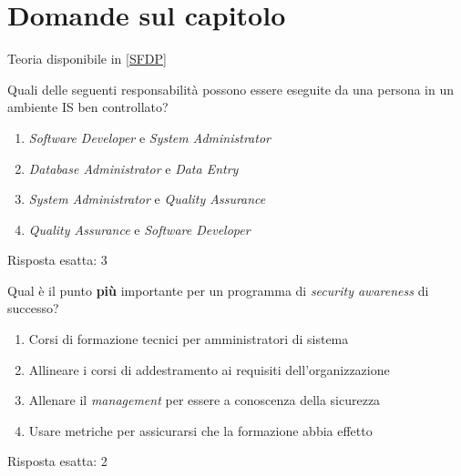 \section{Domande sul capitolo}
\label{esSFDP:generali}

Teoria disponibile in \ref{SFDP}


\begin{Exercise} [
  title={Quiz},
  label={esSFDP5}
  ]

  \Question Quali delle seguenti responsabilità possono essere eseguite da una 
persona in un ambiente IS ben controllato?
\begin{enumerate}
 \item \textit{Software Developer} e \textit{System Administrator}
 \item \textit{Database Administrator} e \textit{Data Entry}
 \item \textit{System Administrator} e \textit{Quality Assurance}
 \item \textit{Quality Assurance} e \textit{Software Developer}
\end{enumerate}
  
\end{Exercise}


\begin{Answer} [
  ref={esSFDP5},
  number={5}
  ]

  \Question Risposta esatta: 3
\end{Answer}


\begin{Exercise} [
  title={Quiz},
  label={esSFDP6}
  ]

  \Question Qual è il punto \textbf{più} importante per un programma di 
\textit{security awareness} di successo?
\begin{enumerate}
 \item Corsi di formazione tecnici per amministratori di sistema
 \item Allineare i corsi di addestramento ai requisiti dell'organizzazione
 \item Allenare il \textit{management} per essere a conoscenza della sicurezza
 \item Usare metriche per assicurarsi che la formazione abbia effetto
\end{enumerate}
  
\end{Exercise}


\begin{Answer} [
  ref={esSFDP6},
  number={6}
  ]

  \Question Risposta esatta: 2
\end{Answer}


